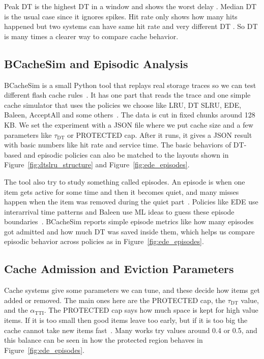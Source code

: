\documentclass[sigconf]{acmart}
\begin{document}
Peak DT is the highest DT in a window and shows the worst delay \cite{Oh2010CachingLess}. Median DT is the usual case since it ignores spikes. Hit rate only shows how many hits happened but two systems can have same hit rate and very different DT \cite{mcallister2024fairywren}. So DT is many times a clearer way to compare cache behavior.


\subsection{BCacheSim and Episodic Analysis}
BCacheSim is a small Python tool that replays real storage traces so we can test different flash cache rules~\cite{wong2024baleen}. It has one part that reads the trace and one simple cache simulator that uses the policies we choose like LRU, DT SLRU, EDE, Baleen, AcceptAll and some others~\cite{Yang2022CacheSack}. The data is cut in fixed chunks around 128\,KB. We set the experiment with a JSON file where we put cache size and a few parameters like $\tau_{\mathrm{DT}}$ or PROTECTED cap. After it runs, it gives a JSON result with basic numbers like hit rate and service time. The basic behaviors of DT-based and episodic policies can also be matched to the layouts shown in Figure~\ref{fig:dtslru_structure} and Figure~\ref{fig:ede_episodes}.

The tool also try to study something called episodes. An episode is when one item gets active for some time and then it becomes quiet, and many misses happen when the item was removed during the quiet part~\cite{Oh2010CachingLess}. Policies like EDE use interarrival time patterns and Baleen use ML ideas to guess these episode boundaries~\cite{mcallister2024fairywren}. BCacheSim reports simple episode metrics like how many episodes got admitted and how much DT was saved inside them, which helps us compare episodic behavior across policies as in Figure~\ref{fig:ede_episodes}.


\subsection{Cache Admission and Eviction Parameters}
Cache systems give some parameters we can tune, and these decide how items get added or removed. The main ones here are the PROTECTED cap, the $\tau_{\mathrm{DT}}$ value, and the $\alpha_{\mathrm{TTI}}$. The PROTECTED cap says how much space is kept for high value items. If it is too small then good items leave too early, but if it is too big the cache cannot take new items fast~\cite{Oh2010CachingLess}. Many works try values around 0.4 or 0.5, and this balance can be seen in how the protected region behaves in Figure~\ref{fig:ede_episodes}.
\end{document}
